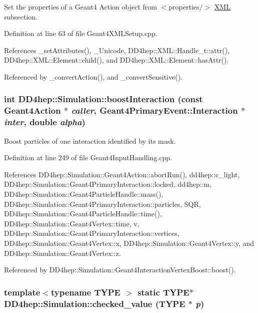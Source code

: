 Set the properties of a Geant4 Action object from $<$properties/$>$ \hyperlink{namespace_d_d4hep_1_1_x_m_l}{XML} subsection. 

Definition at line 63 of file Geant4XMLSetup.cpp.

References \_\-setAttributes(), \_\-Unicode, DD4hep::XML::Handle\_\-t::attr(), DD4hep::XML::Element::child(), and DD4hep::XML::Element::hasAttr().

Referenced by \_\-convertAction(), and \_\-convertSensitive().\hypertarget{namespace_d_d4hep_1_1_simulation_a5af9f919753af128d90ae3bc13dc1c34}{
\subsubsection[{boostInteraction}]{\setlength{\rightskip}{0pt plus 5cm}int DD4hep::Simulation::boostInteraction (const {\bf Geant4Action} $\ast$ {\em caller}, \/  {\bf Geant4PrimaryEvent::Interaction} $\ast$ {\em inter}, \/  double {\em alpha})}}
\label{namespace_d_d4hep_1_1_simulation_a5af9f919753af128d90ae3bc13dc1c34}


Boost particles of one interaction identified by its mask. 

Definition at line 249 of file Geant4InputHandling.cpp.

References DD4hep::Simulation::Geant4Action::abortRun(), dd4hep::c\_\-light, DD4hep::Simulation::Geant4PrimaryInteraction::locked, dd4hep::m, DD4hep::Simulation::Geant4ParticleHandle::mass(), DD4hep::Simulation::Geant4PrimaryInteraction::particles, SQR, DD4hep::Simulation::Geant4ParticleHandle::time(), DD4hep::Simulation::Geant4Vertex::time, v, DD4hep::Simulation::Geant4PrimaryInteraction::vertices, DD4hep::Simulation::Geant4Vertex::x, DD4hep::Simulation::Geant4Vertex::y, and DD4hep::Simulation::Geant4Vertex::z.

Referenced by DD4hep::Simulation::Geant4InteractionVertexBoost::boost().\hypertarget{namespace_d_d4hep_1_1_simulation_aad70a90170b1696df9bf23dfa12cdd99}{
\subsubsection[{checked\_\-value}]{\setlength{\rightskip}{0pt plus 5cm}template$<$typename TYPE $>$ static TYPE$\ast$ DD4hep::Simulation::checked\_\-value (TYPE $\ast$ {\em p})}}
\label{namespace_d_d4hep_1_1_simulation_aad70a90170b1696df9bf23dfa12cdd99}


